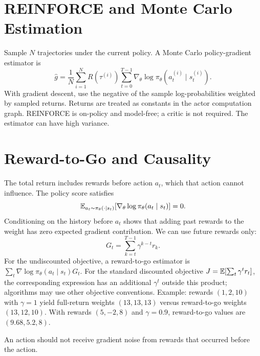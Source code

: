 \section{REINFORCE and Monte Carlo Estimation}
Sample $N$ trajectories under the current policy. A Monte Carlo policy-gradient estimator is
\begin{equation}
\hat g=\frac1N\sum_{i=1}^{N}R(\tau^{(i)})
\sum_{t=0}^{T-1}\nabla_\theta
\log\pi_\theta(a_t^{(i)}\mid s_t^{(i)}).
\end{equation}
With gradient descent, use the negative of the sample log-probabilities weighted by sampled returns. Returns are treated as constants in the actor computation graph. REINFORCE is on-policy and model-free; a critic is not required. The estimator can have high variance.

\section{Reward-to-Go and Causality}
The total return includes rewards before action $a_t$, which that action cannot influence. The policy score satisfies
\begin{equation}
\mathbb{E}_{a_t\sim\pi_\theta(\cdot\mid s_t)}
[\nabla_\theta\log\pi_\theta(a_t\mid s_t)]=0.
\end{equation}
Conditioning on the history before $a_t$ shows that adding past rewards to the weight has zero expected gradient contribution. We can use future rewards only:
\begin{equation}
G_t=\sum_{k=t}^{T-1}\gamma^{k-t}r_k.
\end{equation}
For the undiscounted objective, a reward-to-go estimator is $\sum_t\nabla\log\pi_\theta(a_t\mid s_t)G_t$. For the standard discounted objective $J=\mathbb{E}[\sum_t\gamma^tr_t]$, the corresponding expression has an additional $\gamma^t$ outside this product; algorithms may use other objective conventions.
Example: rewards $(1,2,10)$ with $\gamma=1$ yield full-return weights $(13,13,13)$ versus reward-to-go weights $(13,12,10)$. With rewards $(5,-2,8)$ and $\gamma=0.9$, reward-to-go values are $(9.68,5.2,8)$.
\begin{intuition}
An action should not receive gradient noise from rewards that occurred before the action.
\end{intuition}


